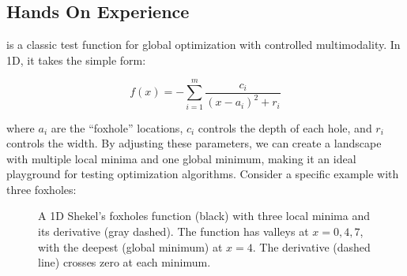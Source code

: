 \newpage
\subsection{Hands On Experience}
 

 is a classic test function for global optimization with controlled multimodality. In 1D, it takes the simple form:

\begin{equation}
    f(x) = -\sum_{i=1}^{m} \frac{c_i}{(x - a_i)^2 + r_i}
\end{equation}

where $a_i$ are the ``foxhole'' locations, $c_i$ controls the depth of each hole, and $r_i$ controls the width. 
By adjusting these parameters, we can create a landscape with multiple local minima and one global minimum, making it an ideal playground for testing optimization algorithms.
Consider a specific example with three foxholes:



\begin{figure}[h]
    \centering
    \caption{A 1D Shekel's foxholes function (black) with three local minima and its derivative (gray dashed). The function has valleys at $x = 0, 4, 7$, with the deepest (global minimum) at $x = 4$. The derivative (dashed line) crosses zero at each minimum.}
    \label{fig:shekel_foxholes_1d}
\end{figure}


